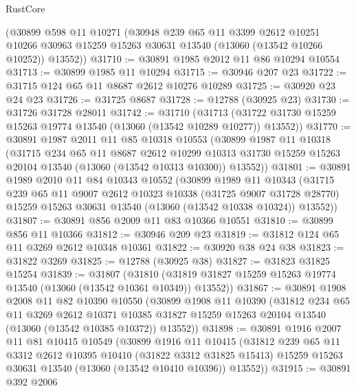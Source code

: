 \begin{lexlean}{RustCore}
\begin{coremodule}
    (@30899
      @598
      @11
      @10271
      (@30948
        @239
        @65
        @11
        @3399
        @2612
        @10251
        @10266
        @30963
        @15259
        @15263
        @30631
        @13540
        (@13060 (@13542 @10266 @10252))
        @13552))
@31710 := @30891 @1985 @2012 @11 @86 @10294 @10554
@31713 := @30899 @1985 @11 @10294
@31715 := @30946 @207 @23
@31722 := @31715 @124 @65 @11 @8687 @2612 @10276 @10289
@31725 := @30920 @23 @24 @23
@31726 := @31725 @8687
@31728 := @12788 (@30925 @23)
@31730 := @31726 @31728 @28011
@31742 := @31710
    (@31713 (@31722 @31730 @15259 @15263 @19774 @13540 (@13060 (@13542 @10289 @10277)) @13552))
@31770 := @30891
    @1987
    @2011
    @11
    @85
    @10318
    @10553
    (@30899
      @1987
      @11
      @10318
      (@31715
        @234
        @65
        @11
        @8687
        @2612
        @10299
        @10313
        @31730
        @15259
        @15263
        @20104
        @13540
        (@13060 (@13542 @10313 @10300))
        @13552))
@31801 := @30891
    @1989
    @2010
    @11
    @84
    @10343
    @10552
    (@30899
      @1989
      @11
      @10343
      (@31715
        @239
        @65
        @11
        @9007
        @2612
        @10323
        @10338
        (@31725 @9007 @31728 @28770)
        @15259
        @15263
        @30631
        @13540
        (@13060 (@13542 @10338 @10324))
        @13552))
@31807 := @30891 @856 @2009 @11 @83 @10366 @10551
@31810 := @30899 @856 @11 @10366
@31812 := @30946 @209 @23
@31819 := @31812 @124 @65 @11 @3269 @2612 @10348 @10361
@31822 := @30920 @38 @24 @38
@31823 := @31822 @3269
@31825 := @12788 (@30925 @38)
@31827 := @31823 @31825 @15254
@31839 := @31807
    (@31810 (@31819 @31827 @15259 @15263 @19774 @13540 (@13060 (@13542 @10361 @10349)) @13552))
@31867 := @30891
    @1908
    @2008
    @11
    @82
    @10390
    @10550
    (@30899
      @1908
      @11
      @10390
      (@31812
        @234
        @65
        @11
        @3269
        @2612
        @10371
        @10385
        @31827
        @15259
        @15263
        @20104
        @13540
        (@13060 (@13542 @10385 @10372))
        @13552))
@31898 := @30891
    @1916
    @2007
    @11
    @81
    @10415
    @10549
    (@30899
      @1916
      @11
      @10415
      (@31812
        @239
        @65
        @11
        @3312
        @2612
        @10395
        @10410
        (@31822 @3312 @31825 @15413)
        @15259
        @15263
        @30631
        @13540
        (@13060 (@13542 @10410 @10396))
        @13552))
@31915 := @30891
    @392
    @2006

\end{coremodule}
\end{lexlean}
